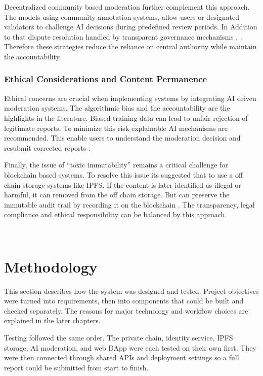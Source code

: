 Decentralized community based moderation further complement this approach. The models using community annotation systems, allow users or designated validators to challenge AI decisions during predefined review periods. In Addition to that dispute resolution handled by transparent governance mechanisms \cite{dzone2026blockchainai}, \cite{kae2025research}. Therefore these strategies reduce the reliance on central authority while maintain the accountability.

\subsubsection*{Ethical Considerations and Content Permanence}

Ethical concerns are crucial when implementing systems by integrating AI driven moderation systems. The algorithmic bias and the accountability are the highlights in the literature. Biased training data can lead to unfair rejection of legitimate reports. To minimize this risk explainable AI mechanisms are recommended. This enable users to understand the moderation decision and resubmit corrected reports \cite{mounika2024integrated}. 

Finally, the issue of “toxic immutability” remains a critical challenge for blockchain based systems. To resolve this issue its suggested that to use a off chain storage systems like IPFS. If the content is later identified as illegal or harmful, it can removed from the off chain storage. But can preserve the immutable audit trail by recording it on the blockchain \cite{prasad2024blockchain}. The transparency, legal compliance and ethical responsibility can be balanced by this approach.

\


\section{Methodology}
This section describes how the system was designed and tested. Project objectives were turned into requirements, then into components that could be built and checked separately. The reasons for major technology and workflow choices are explained in the later chapters.

Testing followed the same order. The private chain, identity service, \ac{IPFS} storage, AI moderation, and web \ac{DApp} were each tested on their own first. They were then connected through shared APIs and deployment settings so a full report could be submitted from start to finish.

